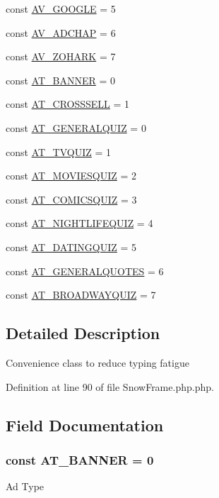 \begin{DoxyCompactItemize}
const \hyperlink{classSF_a47306753d55c09f27103e559354263ae}{AV\_\-GOOGLE} = 5
\item 
const \hyperlink{classSF_a227697c7a52e24a3c120f707e9e9b077}{AV\_\-ADCHAP} = 6
\item 
const \hyperlink{classSF_a10f5636e483476988e38b9872633bc2b}{AV\_\-ZOHARK} = 7
\item 
const \hyperlink{classSF_a93396fd4dba75463c7dc2ceeaaef0375}{AT\_\-BANNER} = 0
\item 
const \hyperlink{classSF_a6fa0275efa28ffffec97c89d046127cc}{AT\_\-CROSSSELL} = 1
\item 
const \hyperlink{classSF_a7345bdf5428de889be26bd1a1b4592bc}{AT\_\-GENERALQUIZ} = 0
\item 
const \hyperlink{classSF_ab0237863b4ffaf75368d62ae9d5019f5}{AT\_\-TVQUIZ} = 1
\item 
const \hyperlink{classSF_ab3bdff48597c946be8bbd7e2a6c50d6f}{AT\_\-MOVIESQUIZ} = 2
\item 
const \hyperlink{classSF_a1765a5b8d431cafad76fc38525960b49}{AT\_\-COMICSQUIZ} = 3
\item 
const \hyperlink{classSF_afde3b6f3fa7656696202c93057cf0ab9}{AT\_\-NIGHTLIFEQUIZ} = 4
\item 
const \hyperlink{classSF_a2d2ba543161829c927e7ce5a04f4a14c}{AT\_\-DATINGQUIZ} = 5
\item 
const \hyperlink{classSF_a55f6c8b6984b1ca031042ffa29412776}{AT\_\-GENERALQUOTES} = 6
\item 
const \hyperlink{classSF_a26f32cb62871967ffda9f601ef93fc02}{AT\_\-BROADWAYQUIZ} = 7
\end{DoxyCompactItemize}


\subsection{Detailed Description}
Convenience class to reduce typing fatigue 

Definition at line 90 of file SnowFrame.php.php.



\subsection{Field Documentation}
\hypertarget{classSF_a93396fd4dba75463c7dc2ceeaaef0375}{
\subsubsection[{AT\_\-BANNER}]{\setlength{\rightskip}{0pt plus 5cm}const {\bf AT\_\-BANNER} = 0}}
\label{classSF_a93396fd4dba75463c7dc2ceeaaef0375}
Ad Type 

